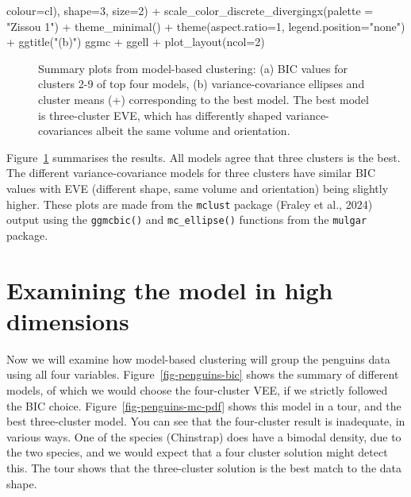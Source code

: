 \documentclass[
  letterpaper,
]{krantz}
\newenvironment{Shaded}{\begin{snugshade}}{\end{snugshade}}
\newcommand{\AttributeTok}[1]{\textcolor[rgb]{0.40,0.45,0.13}{#1}}
\newcommand{\DecValTok}[1]{\textcolor[rgb]{0.68,0.00,0.00}{#1}}
\newcommand{\FunctionTok}[1]{\textcolor[rgb]{0.28,0.35,0.67}{#1}}
\newcommand{\NormalTok}[1]{\textcolor[rgb]{0.00,0.23,0.31}{#1}}
\newcommand{\SpecialCharTok}[1]{\textcolor[rgb]{0.37,0.37,0.37}{#1}}
\newcommand{\StringTok}[1]{\textcolor[rgb]{0.13,0.47,0.30}{#1}}
\begin{document}
\begin{Shaded}
\begin{Highlighting}[]
                                        \AttributeTok{colour=}\NormalTok{cl),}
              \AttributeTok{shape=}\DecValTok{3}\NormalTok{, }\AttributeTok{size=}\DecValTok{2}\NormalTok{) }\SpecialCharTok{+}
  \FunctionTok{scale\_color\_discrete\_divergingx}\NormalTok{(}\AttributeTok{palette =} \StringTok{"Zissou 1"}\NormalTok{)  }\SpecialCharTok{+}
  \FunctionTok{theme\_minimal}\NormalTok{() }\SpecialCharTok{+}
  \FunctionTok{theme}\NormalTok{(}\AttributeTok{aspect.ratio=}\DecValTok{1}\NormalTok{, }\AttributeTok{legend.position=}\StringTok{"none"}\NormalTok{) }\SpecialCharTok{+}
  \FunctionTok{ggtitle}\NormalTok{(}\StringTok{"(b)"}\NormalTok{)}
\NormalTok{ggmc }\SpecialCharTok{+}\NormalTok{ ggell }\SpecialCharTok{+} \FunctionTok{plot\_layout}\NormalTok{(}\AttributeTok{ncol=}\DecValTok{2}\NormalTok{)}
\end{Highlighting}
\end{Shaded}

\begin{figure}[H]


\caption{\label{fig-penguins-bl-fl-mc}Summary plots from model-based
clustering: (a) BIC values for clusters 2-9 of top four models, (b)
variance-covariance ellipses and cluster means (+) corresponding to the
best model. The best model is three-cluster EVE, which has differently
shaped variance-covariances albeit the same volume and orientation.}

\end{figure}%

Figure~\ref{fig-penguins-bl-fl-mc} summarises the results. All models
agree that three clusters is the best. The different variance-covariance
models for three clusters have similar BIC values with EVE (different
shape, same volume and orientation) being slightly higher. These plots
are made from the \texttt{mclust} package (Fraley et al., 2024) output
using the \texttt{ggmcbic()} and \texttt{mc\_ellipse()} functions from
the \texttt{mulgar} package.

\section{Examining the model in high
dimensions}\label{examining-the-model-in-high-dimensions}

Now we will examine how model-based clustering will group the penguins
data using all four variables. Figure~\ref{fig-penguins-bic} shows the
summary of different models, of which we would choose the four-cluster
VEE, if we strictly followed the BIC choice.
Figure~\ref{fig-penguins-mc-pdf} shows this model in a tour, and the
best three-cluster model. You can see that the four-cluster result is
inadequate, in various ways. One of the species (Chinstrap) does have a
bimodal density, due to the two species, and we would expect that a four
cluster solution might detect this. The tour shows that the
three-cluster solution is the best match to the data shape.
\end{document}
